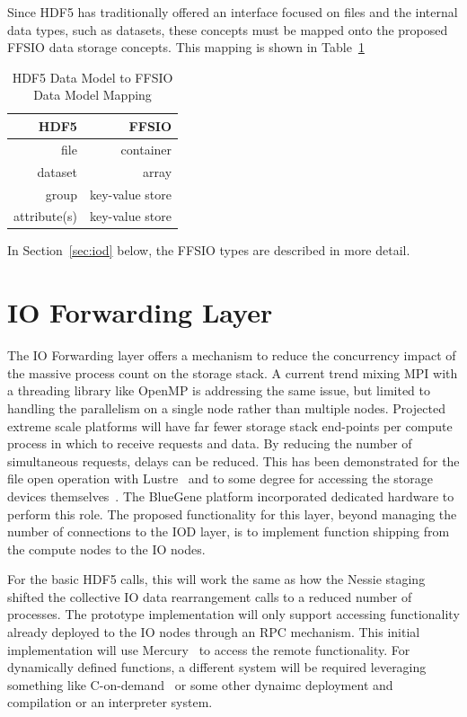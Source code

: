 \documentclass[conference]{IEEEtran}
\begin{document}
Since HDF5 has traditionally offered an interface focused on files and the
internal data types, such as datasets, these concepts must be mapped onto the
proposed FFSIO data storage concepts. This mapping is shown in Table~\ref{tab:mapping}

\begin{table}[ht]
    \vspace{-0.10in}
    \centering
    \caption[HDF5 to FFSIO Mapping]{HDF5 Data Model to FFSIO Data Model Mapping}
    \bigskip
    \vspace{-0.15in}

    \begin{tabular}{|r|r|}
\hline
HDF5 & FFSIO\\
\hline
file & container \\
dataset & array \\
group & key-value store \\
attribute(s) & key-value store \\
\hline
    \end{tabular}
    \label{tab:mapping}
\end{table}

In Section~\ref{sec:iod} below, the FFSIO types are described in more detail.

\section{IO Forwarding Layer}
\label{sec:iof}

The IO Forwarding layer offers a mechanism to reduce the concurrency impact of
the massive process count on the storage stack. A current trend mixing MPI with
a threading library like OpenMP is addressing the same issue, but limited to
handling the parallelism on a single node rather than multiple nodes. Projected
extreme scale platforms will have far fewer storage stack end-points per
compute process in which to receive requests and data. By reducing the number
of simultaneous requests, delays can be reduced. This has been demonstrated for
the file open operation with Lustre~\cite{lofstead:2009:adaptable} and to some
degree for accessing the storage devices
themselves~\cite{lofstead:2010:io-variability}.  The BlueGene platform
incorporated dedicated hardware to perform this role. The proposed
functionality for this layer, beyond managing the number of connections to the
IOD layer, is to implement function shipping from the compute nodes to the IO
nodes.

For the basic HDF5 calls, this will work the same as how the Nessie
staging~\cite{lofstead:2011:nessie-staging} shifted the collective IO data
rearrangement calls to a reduced number of processes. The prototype
implementation will only support accessing functionality already deployed to
the IO nodes through an RPC mechanism. This initial implementation will use
Mercury~\cite{Soumagne:2013:mercury} to access the remote functionality. For
dynamically defined functions, a different system will be required leveraging
something like C-on-demand~\cite{abbasi:2011:c-on-demand} or some other dynaimc
deployment and compilation or an interpreter system.
\end{document}
